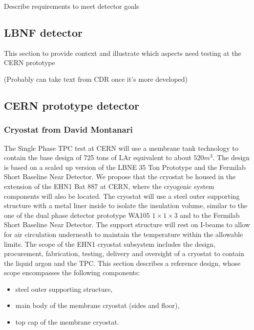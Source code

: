 Describe requirements to meet detector goals

\subsection{LBNF detector}
This section to provide context and illustrate which aspects need testing at the CERN prototype

(Probably can take text from CDR once it's more developed)

\subsection{CERN prototype detector}

\subsubsection{Cryostat from David Montanari}
The Single Phase TPC test at CERN will use a membrane tank technology to contain the base design of 725 tons of LAr equivalent to about $520 m^3$. The design is based on a scaled up version of the LBNE 35 Ton Prototype and the Fermilab Short Baseline Near Detector. We propose that the cryostat be housed in the extension of the EHN1 Bat 887 at CERN, where the cryogenic system components will also be located. The cryostat will use a steel outer supporting structure with a metal liner inside to isolate the insulation volume, similar to the one of the dual phase detector prototype WA105 $1\times1\times3$ and to the Fermilab Short Baseline Near Detector. The support structure will rest on I-beams to allow for air circulation underneath to maintain the temperature within the allowable limits.
The scope of the EHN1 cryostat subsystem includes the design, procurement, fabrication, testing, delivery and oversight of a cryostat to contain the liquid argon and the TPC. This section describes a reference design, whose scope encompasses the following components:

\begin{itemize}
\item steel outer supporting structure,
\item main body of the membrane cryostat (sides and floor), 
\item top cap of the membrane cryostat.
\end{itemize}

